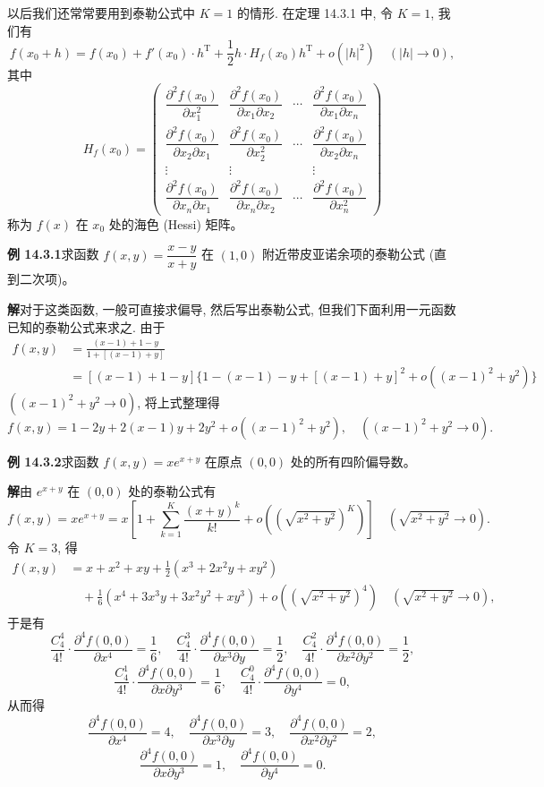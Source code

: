 \documentclass[UTF8, 12pt, fontset=fandol, oneside]{ctexart}
\begin{document}
以后我们还常常要用到泰勒公式中 $K=1$ 的情形. 在定理 14.3.1 中, 令 $K=1$, 我们有
\[
  f(x_0+h)=f(x_0)+f'(x_0)\cdot h^\mathrm T
  +\frac12 h\cdot H_f(x_0)h^\mathrm T+o(|h|^2)
  \quad(|h|\to0),
\]
其中
\[
  H_f(x_0)=
  \begin{pmatrix}
    \dfrac{\partial^2 f(x_0)}{\partial x_1^2} &
    \dfrac{\partial^2 f(x_0)}{\partial x_1\partial x_2} &
    \cdots &
    \dfrac{\partial^2 f(x_0)}{\partial x_1\partial x_n}\\
    \dfrac{\partial^2 f(x_0)}{\partial x_2\partial x_1} &
    \dfrac{\partial^2 f(x_0)}{\partial x_2^2} &
    \cdots &
    \dfrac{\partial^2 f(x_0)}{\partial x_2\partial x_n}\\
    \vdots & \vdots & & \vdots\\
    \dfrac{\partial^2 f(x_0)}{\partial x_n\partial x_1} &
    \dfrac{\partial^2 f(x_0)}{\partial x_n\partial x_2} &
    \cdots &
    \dfrac{\partial^2 f(x_0)}{\partial x_n^2}
  \end{pmatrix}
\]
称为 $f(x)$ 在 $x_0$ 处的海色 (Hessi) 矩阵。

\noindent\textbf{例 14.3.1}\quad 求函数 $f(x,y)=\dfrac{x-y}{x+y}$ 在 $(1,0)$ 附近带皮亚诺余项的泰勒公式 (直到二次项)。

\noindent\textbf{解}\quad 对于这类函数, 一般可直接求偏导, 然后写出泰勒公式, 但我们下面利用一元函数已知的泰勒公式来求之. 由于
\[
\begin{aligned}
  f(x,y)
  &=\frac{(x-1)+1-y}{1+[(x-1)+y]}\\
  &=[(x-1)+1-y]\{1-(x-1)-y+[(x-1)+y]^2
  +o((x-1)^2+y^2)\}
\end{aligned}
\]
$((x-1)^2+y^2\to0)$, 将上式整理得
\[
  f(x,y)=1-2y+2(x-1)y+2y^2+o((x-1)^2+y^2),
  \quad ((x-1)^2+y^2\to0).
\]

\noindent\textbf{例 14.3.2}\quad 求函数 $f(x,y)=xe^{x+y}$ 在原点 $(0,0)$ 处的所有四阶偏导数。

\noindent\textbf{解}\quad 由 $e^{x+y}$ 在 $(0,0)$ 处的泰勒公式有
\[
  f(x,y)=xe^{x+y}
  =x\left[1+\sum_{k=1}^K\frac{(x+y)^k}{k!}
  +o\left((\sqrt{x^2+y^2})^K\right)\right]
  \quad(\sqrt{x^2+y^2}\to0).
\]
令 $K=3$, 得
\[
\begin{aligned}
  f(x,y)
  &=x+x^2+xy+\frac12(x^3+2x^2y+xy^2)\\
  &\quad+\frac16(x^4+3x^3y+3x^2y^2+xy^3)
  +o\left((\sqrt{x^2+y^2})^4\right)
  \quad(\sqrt{x^2+y^2}\to0),
\end{aligned}
\]
于是有
\[
  \frac{C_4^4}{4!}\cdot\frac{\partial^4 f(0,0)}{\partial x^4}=\frac16,\quad
  \frac{C_4^3}{4!}\cdot\frac{\partial^4 f(0,0)}{\partial x^3\partial y}=\frac12,\quad
  \frac{C_4^2}{4!}\cdot\frac{\partial^4 f(0,0)}{\partial x^2\partial y^2}=\frac12,
\]
\[
  \frac{C_4^1}{4!}\cdot\frac{\partial^4 f(0,0)}{\partial x\partial y^3}=\frac16,\quad
  \frac{C_4^0}{4!}\cdot\frac{\partial^4 f(0,0)}{\partial y^4}=0,
\]
从而得
\[
  \frac{\partial^4 f(0,0)}{\partial x^4}=4,\quad
  \frac{\partial^4 f(0,0)}{\partial x^3\partial y}=3,\quad
  \frac{\partial^4 f(0,0)}{\partial x^2\partial y^2}=2,
\]
\[
  \frac{\partial^4 f(0,0)}{\partial x\partial y^3}=1,\quad
  \frac{\partial^4 f(0,0)}{\partial y^4}=0.
\]
\end{document}
